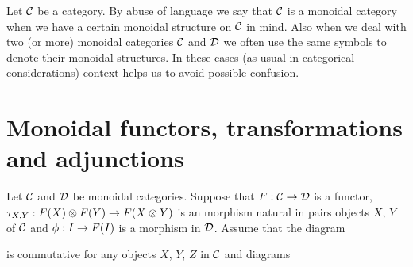 \noindent
Let ${\mathcal C}$ be a category. By abuse of language we say that ${\mathcal C}$ is a monoidal category when we have a certain monoidal structure on ${\mathcal C}$ in mind. Also when we deal with two (or more) monoidal categories ${\mathcal C}$ and ${\mathcal D}$ we often use the same symbols to denote their monoidal structures. In these cases (as usual in categorical considerations) context helps us to avoid possible confusion.

\section{Monoidal functors, transformations and adjunctions}

\begin{definition}
Let ${\mathcal C}$ and ${\mathcal D}$ be monoidal categories. Suppose that $F:{\mathcal C}\rightarrow {\mathcal D}$ is a functor, $\tau_{X,Y}:F(X)\otimes F(Y)\rightarrow F(X\otimes Y)$ is an morphism natural in pairs objects $X$, $Y$ of ${\mathcal C}$ and $\phi:I\rightarrow F(I)$ is a morphism in ${\mathcal D}$. Assume that the diagram
\begin{center}
\end{center}
is commutative for any objects $X$, $Y$, $Z$ in ${\mathcal C}$ and diagrams
\begin{center}
\end{center}
\end{definition}
